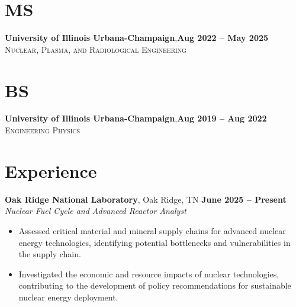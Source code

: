 \documentclass[margin,line]{resume}
\begin{document}
\begin{resume}
    \section{\mysidestyle MS}
    \textbf{University of Illinois Urbana-Champaign},\hfill\textbf{Aug 2022 -- May 2025}\\
    \textsc{Nuclear, Plasma, and Radiological Engineering}\\
    \vspace{-5.5mm}
    \section{\mysidestyle BS}
    \textbf{University of Illinois Urbana-Champaign},\hfill\textbf{Aug 2019 -- Aug 2022}\\%
    \textsc{Engineering Physics}\\
    \vspace{-5mm}

    \section{\mysidestyle Experience}
    \textbf{Oak Ridge National Laboratory}, Oak Ridge, TN \hfill \textbf{June 2025 -- Present} \\
    \textsl{Nuclear Fuel Cycle and Advanced Reactor Analyst} \\
    \begin{itemize}
        \item Assessed critical material and mineral supply chains for advanced nuclear energy technologies, identifying potential bottlenecks and vulnerabilities in the supply chain.
        \item Investigated the economic and resource impacts of nuclear technologies, contributing to the development of policy recommendations for sustainable nuclear energy deployment.
    \end{itemize}


\end{resume}
\end{document}
